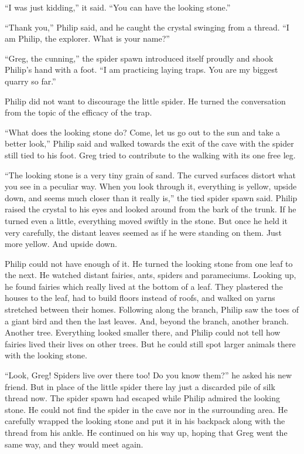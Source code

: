 \documentclass[10pt, draft]{memoir}
\begin{document}
``I was just kidding,'' it said. ``You can have the looking stone.''

``Thank you,'' Philip said, and he caught the crystal swinging from a thread. ``I am Philip, the explorer. What is your name?''

``Greg, the cunning,'' the spider spawn introduced itself proudly and shook Philip's hand with a foot. ``I am practicing laying traps. You are my biggest quarry so far.''

Philip did not want to discourage the little spider. He turned the conversation from the topic of the efficacy of the trap.

``What does the looking stone do? Come, let us go out to the sun and take a better look,'' Philip said and walked towards the exit of the cave with the spider still tied to his foot. Greg tried to contribute to the walking with its one free leg.

``The looking stone is a very tiny grain of sand. The curved surfaces distort what you see in a peculiar way. When you look through it, everything is yellow, upside down, and seems much closer than it really is,'' the tied spider spawn said. Philip raised the crystal to his eyes and looked around from the bark of the trunk. If he turned even a little, everything moved swiftly in the stone. But once he held it very carefully, the distant leaves seemed as if he were standing on them. Just more yellow. And upside down.

Philip could not have enough of it. He turned the looking stone from one leaf to the next. He watched distant fairies, ants, spiders and parameciums. Looking up, he found fairies which really lived at the bottom of a leaf. They plastered the houses to the leaf, had to build floors instead of roofs, and walked on yarns stretched between their homes. Following along the branch, Philip saw the toes of a giant bird and then the last leaves. And, beyond the branch, another branch. Another tree. Everything looked smaller there, and Philip could not tell how fairies lived their lives on other trees. But he could still spot larger animals there with the looking stone.

``Look, Greg! Spiders live over there too! Do you know them?'' he asked his new friend. But in place of the little spider there lay just a discarded pile of silk thread now. The spider spawn had escaped while Philip admired the looking stone. He could not find the spider in the cave nor in the surrounding area. He carefully wrapped the looking stone and put it in his backpack along with the thread from his ankle. He continued on his way up, hoping that Greg went the same way, and they would meet again.
\end{document}
